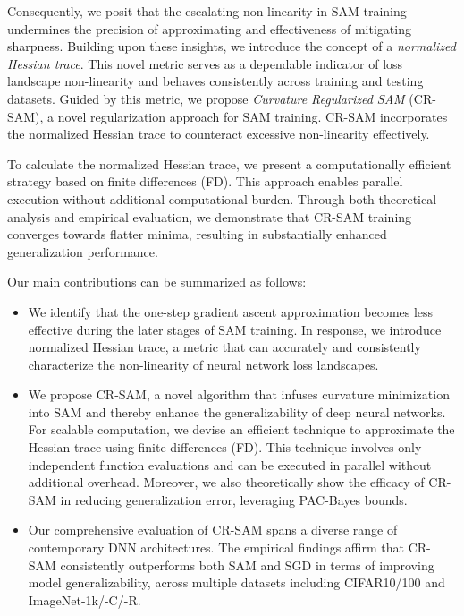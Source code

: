 \documentclass[letterpaper]{article} %
\theoremstyle{plain}
\theoremstyle{definition}
\begin{document}
Consequently, we posit that the escalating non-linearity in SAM training undermines the precision of approximating and effectiveness of mitigating sharpness. Building upon these insights, we introduce the concept of a {\em normalized Hessian trace}. This novel metric serves as a dependable indicator of loss landscape non-linearity and behaves consistently across training and testing datasets. Guided by this metric, we propose {\em Curvature Regularized SAM} (CR-SAM), a novel regularization approach for SAM training. CR-SAM incorporates the normalized Hessian trace to counteract excessive non-linearity effectively.

To calculate the normalized Hessian trace, we present a computationally efficient strategy based on finite differences (FD). This approach enables parallel execution without additional computational burden. Through both theoretical analysis and empirical evaluation, we demonstrate that CR-SAM training converges towards flatter minima, resulting in substantially enhanced generalization performance.

Our main contributions can be summarized as follows: 
\begin{itemize}
    \item We identify that the one-step gradient ascent approximation becomes less effective during the later stages of SAM training. In response, we introduce normalized Hessian trace, a metric that can accurately and consistently characterize the non-linearity of neural network loss landscapes.

    \item We propose CR-SAM, a novel algorithm that infuses curvature minimization into SAM and thereby enhance the generalizability of deep neural networks. For scalable computation, we devise an efficient technique to approximate the Hessian trace using finite differences (FD). This technique involves only independent function evaluations and can be executed in parallel without additional overhead. Moreover, we also theoretically show the efficacy of CR-SAM in reducing generalization error, leveraging PAC-Bayes bounds.

    \item Our comprehensive evaluation of CR-SAM spans a diverse range of contemporary DNN architectures. The empirical findings affirm that CR-SAM consistently outperforms both SAM and SGD in terms of improving model generalizability, across multiple datasets including CIFAR10/100 and ImageNet-1k/-C/-R.
\end{itemize}
\end{document}
